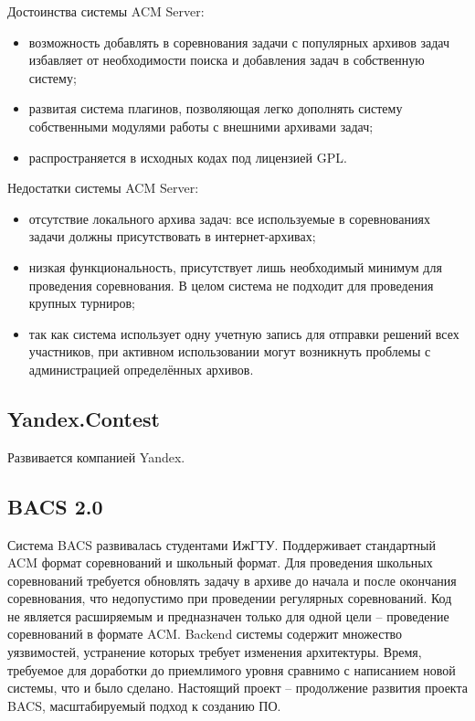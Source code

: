 Достоинства системы ACM Server:
\begin{itemize}
    \item возможность добавлять в соревнования задачи с популярных архивов задач
        избавляет от необходимости поиска и добавления задач в собственную систему;
    \item развитая система плагинов, позволяющая легко дополнять систему
        собственными модулями работы с внешними архивами задач;
    \item распространяется в исходных кодах под лицензией GPL.
\end{itemize}

Недостатки системы ACM Server:
\begin{itemize}
    \item отсутствие локального архива задач:
        все используемые в соревнованиях задачи должны присутствовать в интернет-архивах;
    \item низкая функциональность, присутствует лишь необходимый минимум для проведения соревнования.
        В целом система не подходит для проведения крупных турниров;
    \item так как система использует одну учетную запись для отправки решений всех участников,
        при активном использовании могут возникнуть проблемы с администрацией определённых архивов.
\end{itemize}

\subsection{Yandex.Contest}
Развивается компанией Yandex.

\subsection{BACS 2.0}
Система BACS \cite{bacs2} развивалась студентами ИжГТУ.
Поддерживает стандартный ACM формат соревнований и школьный формат.
Для проведения школьных соревнований требуется обновлять задачу в архиве до начала и после окончания соревнования,
что недопустимо при проведении регулярных соревнований.
Код не является расширяемым и предназначен только для одной цели -- проведение соревнований в формате ACM.
Backend системы содержит множество уязвимостей, устранение которых требует изменения архитектуры.
Время, требуемое для доработки до приемлимого уровня сравнимо с написанием новой системы, что и было сделано.
Настоящий проект -- продолжение развития проекта BACS, масштабируемый подход к созданию ПО.
